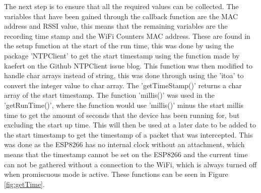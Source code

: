 \documentclass{report}
\begin{document}
The next step is to ensure that all the required values can be collected. The variables that have been gained through the callback function are the MAC address and RSSI value, this means that the remaining variables are the recording time stamp and the WiFi Counters MAC address. These are found in the setup function at the start of the run time, this was done by using the package 'NTPClient'\cite{NTPClient} to get the start timestamp using the function made by kaefert on the Github NTPClient issue blog\cite{getCurrentTime}. This function was then modified to handle char arrays instead of string, this was done through using the 'itoa'\cite{itoa} to convert the integer value to char array. The 'getTimeStamp()' returns a char array of the start timestamp. The function 'millis()'\cite{millis} was used in the 'getRunTime()', where the function would use 'millis()'\cite{millis} minus the start millis time to get the amount of seconds that the device has been running for, but excluding the start up time. This will then be used at a later date to be added to the start timestamp to get the timestamp of a packet that was intercepted. This was done as the ESP8266 has no internal clock without an attachment, which means that the timestamp cannot be set on the ESP8266 and the current time can not be gathered without a connection to the WiFi, which is always turned off when promiscuous mode is active. These functions can be seen in Figure \ref{fig:getTime}.\\ \newline
\clearpage
\end{document}
